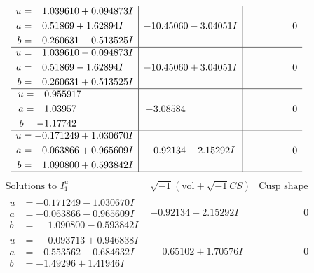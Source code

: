 \documentclass[1p]{elsarticle_modified}
\theoremstyle{definition}
\newcommand{\I}{\sqrt{-1}}
\begin{document}
$$\begin{array}{c|c|c}
\begin{aligned}
u &= \phantom{-}1.039610 + 0.094873 I \\
a &= \phantom{-}0.51869 + 1.62894 I \\
b &= \phantom{-}0.260631 - 0.513525 I\end{aligned}
 & -10.45060 - 3.04051 I & \phantom{-0.000000 } 0 \\ \hline\begin{aligned}
u &= \phantom{-}1.039610 - 0.094873 I \\
a &= \phantom{-}0.51869 - 1.62894 I \\
b &= \phantom{-}0.260631 + 0.513525 I\end{aligned}
 & -10.45060 + 3.04051 I & \phantom{-0.000000 } 0 \\ \hline\begin{aligned}
u &= \phantom{-}0.955917\phantom{ +0.000000I} \\
a &= \phantom{-}1.03957\phantom{ +0.000000I} \\
b &= -1.17742\phantom{ +0.000000I}\end{aligned}
 & -3.08584\phantom{ +0.000000I} & \phantom{-0.000000 } 0 \\ \hline\begin{aligned}
u &= -0.171249 + 1.030670 I \\
a &= -0.063866 + 0.965609 I \\
b &= \phantom{-}1.090800 + 0.593842 I\end{aligned}
 & -0.92134 - 2.15292 I & \phantom{-0.000000 } 0\\
 \hline 
 \end{array}$$\newpage$$\begin{array}{c|c|c}  
\text{Solutions to }I^u_{1}& \I (\text{vol} + \sqrt{-1}CS) & \text{Cusp shape}\\
 \hline 
\begin{aligned}
u &= -0.171249 - 1.030670 I \\
a &= -0.063866 - 0.965609 I \\
b &= \phantom{-}1.090800 - 0.593842 I\end{aligned}
 & -0.92134 + 2.15292 I & \phantom{-0.000000 } 0 \\ \hline\begin{aligned}
u &= \phantom{-}0.093713 + 0.946838 I \\
a &= -0.553562 - 0.684632 I \\
b &= -1.49296 + 1.41946 I\end{aligned}
 & \phantom{-}0.65102 + 1.70576 I & \phantom{-0.000000 } 0 \\ \hline\begin{aligned}

\end{aligned}
\end{array}$$
\end{document}
